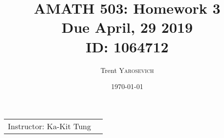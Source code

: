 \documentclass{article}
\title{AMATH 503: Homework 3 \\Due April, 29 2019 \\ ID: 1064712} %
\author{Trent \textsc{Yarosevich}} %
\date{\today} %
\begin{document}
\maketitle %
\setlength\parindent{1cm}

\begin{center}
\begin{tabular}{l r}
Instructor: Ka-Kit Tung %
\end{tabular}
\end{center}
\doublespacing

\end{document}

